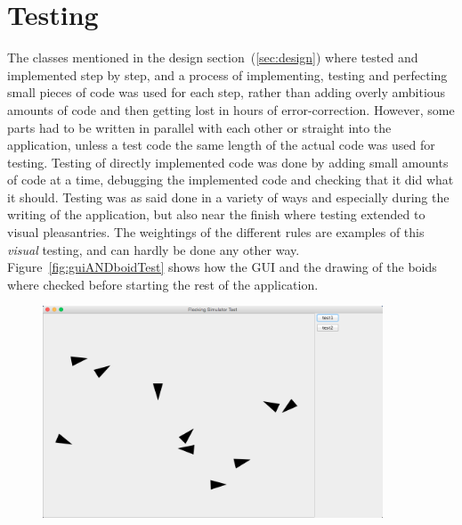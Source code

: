 \documentclass[a4paper,twoside, 10pt]{report}
\begin{document}
\section{Testing}
\label{sec:testing}

\begin{minipage}[t]{0.50\textwidth}
The classes mentioned in the design section~(\ref{sec:design}) where tested and implemented step by step, and a process of implementing, testing and perfecting small pieces of code was used for each step, rather than adding overly ambitious amounts of code and then getting lost in hours of error-correction. However, some parts had to be written in parallel with each other or straight into the application, unless a test code the same length of the actual code was used for testing. Testing of directly implemented code was done by adding small amounts of code at a time, debugging the implemented code and checking that it did what it should. Testing was as said done in a variety of ways and especially during the writing of the application, but also near the finish where testing extended to visual pleasantries. The weightings of the different rules are examples of this \textit{visual} testing, and can hardly be done any other way. Figure~\ref{fig:guiANDboidTest} shows how the GUI and the drawing of the boids where checked before starting the rest of the application.
\end{minipage}
%
\begin{minipage}[t]{0.50\textwidth}
    \captionsetup{type=figure}
    \begin{figure}[H]
    	\hfill
      \includegraphics[width=0.9\textwidth]{images/GUITest.png}
    \end{figure}
    \caption{Test of GUI and drawing of boids}
    \label{fig:guiANDboidTest}
    \abovecaptionskip \belowcaptionskip
\end{minipage}
\end{document}
